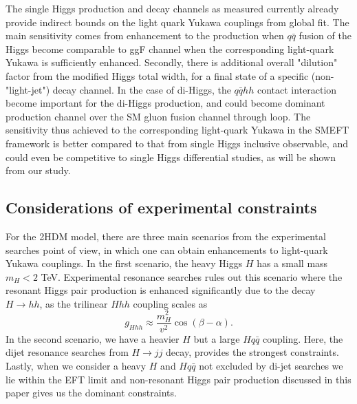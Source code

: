 The single Higgs production and decay channels as measured currently already provide indirect bounds on the light quark Yukawa couplings from global fit. The main sensitivity comes from enhancement to the production when $q\bar q$ fusion of the Higgs become comparable to ggF channel when the corresponding light-quark Yukawa is sufficiently enhanced. Secondly, there is additional overall "dilution" factor from the modified Higgs total width, for a final state of a specific (non-"light-jet") decay channel.
In the case of di-Higgs, the $q\bar q hh$ contact interaction become important for the di-Higgs production, and could become dominant production channel over the SM gluon fusion channel through loop. The sensitivity thus achieved to the corresponding light-quark Yukawa in the SMEFT framework is better compared to that from single Higgs inclusive observable, and could even be competitive to single Higgs differential studies, as will be shown from our study.


\subsection{Considerations of experimental constraints}
For the 2HDM model, there are three main scenarios from the experimental searches point of view, in which one can obtain enhancements to light-quark Yukawa couplings. In the first scenario, the heavy Higgs $H$ has a small mass~$m_H <2$ TeV. Experimental resonance searches rules out this scenario where the resonant Higgs pair production is enhanced significantly due to the decay~$ H\to hh$, as the trilinear $Hhh$ coupling scales as~\cite{Egana-Ugrinovic:2021uew}
\begin{equation}
	g_{Hhh}\approx \frac{m_H^2}{v^2} \cos(\beta-\alpha).
\end{equation}
In the second scenario, we have a heavier $H$ but a large $Hq\bar{q}$ coupling. Here, the dijet resonance searches from $H\to jj$ decay, provides the strongest constraints. Lastly, when we consider a heavy $H$ and $Hq\bar{q}$  not excluded by di-jet searches we lie within the EFT limit and non-resonant Higgs pair production discussed in this paper gives us the dominant constraints.

